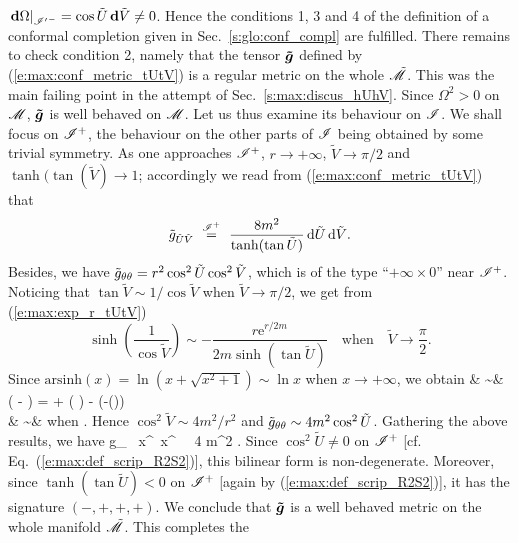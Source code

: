 $\left.\mathbf{d}\Omega\right|_{{\mathscr{I}'}^-} = \cos\tilde{U}\, \mathbf{d}\tilde{V}\not=0$.
Hence the conditions 1, 3 and 4 of the definition of a conformal completion
given in Sec.~\ref{s:glo:conf_compl} are fulfilled. There remains to check
condition 2, namely that the tensor $\bm{\tilde{g}}$ defined
by (\ref{e:max:conf_metric_tUtV}) is a regular metric on the whole $\tilde{\mathscr{M}}$.
This was the main failing point in the attempt of Sec.~\ref{s:max:discus_hUhV}.
Since $\Omega^2 > 0$ on $\mathscr{M}$, $\bm{\tilde{g}}$ is well behaved on $\mathscr{M}$. Let us
thus examine its behaviour on $\mathscr{I}$. We shall focus
on $\mathscr{I}^+$, the behaviour on the other parts of $\mathscr{I}$ being obtained by
some trivial symmetry. As one approaches $\mathscr{I}^+$, $r\rightarrow +\infty$,
$\tilde{V}\rightarrow \pi/2$ and $\tanh(\tan(\tilde{V})\rightarrow 1$;
accordingly
we read from (\ref{e:max:conf_metric_tUtV}) that
\[
    \tilde{g}_{\tilde{U}\tilde{V}}
    \ \stackrel{\mathscr{I}^+}{=}\  \frac{8 m^2}{\tanh(\tan\tilde{U})} \,
    \mathrm{d}\tilde{U} \, \mathrm{d}\tilde{V} .
\]
Besides, we have
$\tilde{g}_{\theta\theta} = r^2 \cos^2\tilde{U}\cos^2\tilde{V}$, which is of the type
``$+\infty \times 0$'' near $\mathscr{I}^+$. Noticing that
$\tan\tilde{V}\sim 1/\cos\tilde{V}$ when $\tilde{V}\rightarrow \pi/2$, we get
from (\ref{e:max:exp_r_tUtV})
\[
    \sinh\left(\frac{1}{\cos\tilde{V}}\right) \sim - \frac{r \mathrm{e}^{r/2m}}{2m\sinh(\tan\tilde{U})}
        \quad \mbox{when} \quad \tilde{V}\rightarrow \frac{\pi}{2} .
\]
Since $\mathrm{arsinh}(x) = \ln(x + \sqrt{x^2+1}) \sim \ln x$ when $x\rightarrow +\infty$,
we obtain
\bea
     & \sim & \ln\left( -  \right)
        =  + \ln \left(  \right) - \ln\left(-\sinh(\tan{})\right) \nonumber \\
        & \sim &  \quad \mbox{when} \quad {}\rightarrow {} .
            \nonumber
\eea
Hence $\cos^2\tilde{V} \sim 4m^2 / r^2$ and $\tilde{g}_{\theta\theta} \sim 4 m^2 \cos^2\tilde{U}$.
Gathering the above results, we have
\be
   {\tilde g}_{\mu\nu} \, \D x^\mu \, \D x^\nu
   \ \stackrel{\scri^+}{=}\  4 m^2  .
\ee
Since $\cos^2\tilde{U} \not=0$ on $\mathscr{I}^+$ [cf. Eq.~(\ref{e:max:def_scrip_R2S2})],
this bilinear form is non-degenerate.
Moreover, since $\tanh(\tan\tilde{U})<0$ on $\mathscr{I}^+$ [again by (\ref{e:max:def_scrip_R2S2})], it has the
signature $(-,+,+,+)$.
 We conclude that $\bm{\tilde{g}}$ is
a well behaved metric on the whole manifold $\tilde{\mathscr{M}}$. This completes the
